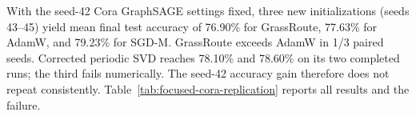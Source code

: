 With the seed-42 Cora GraphSAGE settings fixed, three new initializations
(seeds 43--45) yield mean final test accuracy of 76.90\% for GrassRoute,
77.63\% for AdamW, and 79.23\% for SGD-M. GrassRoute exceeds AdamW in 1/3
paired seeds. Corrected periodic SVD reaches 78.10\% and 78.60\% on its
two completed runs; the third fails numerically. The seed-42 accuracy gain
therefore does not repeat consistently. Table~\ref{tab:focused-cora-replication}
reports all results and the failure.\par
